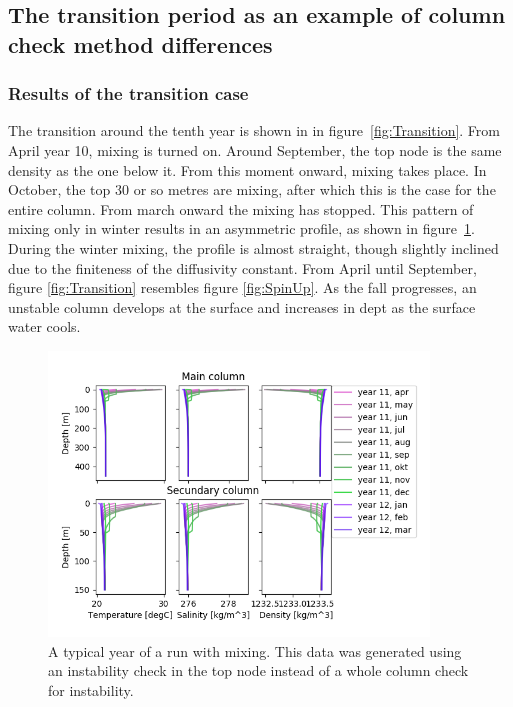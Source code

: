 \documentclass[twocolumn]{article}
\begin{document}
 
\subsection{The transition period as an example of column check method differences}
\label{sect:transition}
\subsubsection{Results of the transition case}
The transition around the tenth year is shown in in figure~\ref{fig:Transition}. From April year 10, mixing is turned on. Around September, the top node is the same density as the one below it. From this moment onward, mixing takes place. In October, the top 30 or so metres are mixing, after which this is the case for the entire column. From march onward the mixing has stopped. This pattern of mixing only in winter results in an asymmetric profile, as shown in figure~\ref{fig:Conv_Only}. During the winter mixing, the profile is almost straight, though slightly inclined due to the finiteness of the diffusivity constant. From April until September, figure \ref{fig:Transition} resembles figure \ref{fig:SpinUp}. As the fall progresses, an unstable column develops at the surface and increases in dept as the surface water cools. 

\begin{figure}
\centering
\includegraphics[width=0.9\textwidth,keepaspectratio]{Conv_only.png}
\caption{A typical year of a run with mixing. This data was generated using an instability check in the top node instead of a whole column check for instability.}
\label{fig:Conv_Only}
\end{figure}
\end{document}
